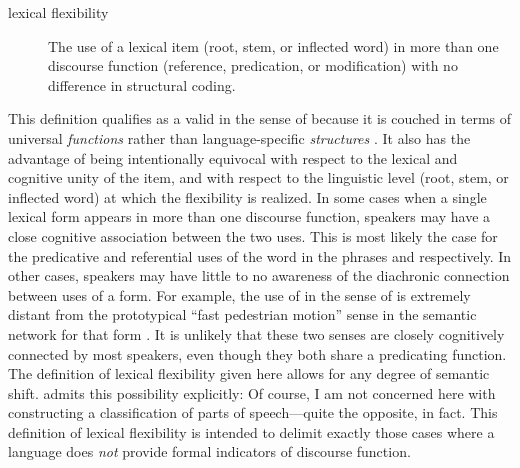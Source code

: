 \begin{description}
  \item[lexical flexibility] The use of a lexical item (root, stem, or inflected word) in more than one discourse function (reference, predication, or modification) with no difference in structural coding.
\end{description}

This definition qualifies as a valid  in the sense of \textcite{Haspelmath2010a} because it is couched in terms of universal \emph{functions} rather than language-specific \emph{structures} \parencite{Croft2016}. It also has the advantage of being intentionally equivocal with respect to the lexical and cognitive unity of the item, and with respect to the linguistic level (root, stem, or inflected word) at which the flexibility is realized. In some cases when a single lexical form appears in more than one discourse function, speakers may have a close cognitive association between the two uses. This is most likely the case for the predicative and referential uses of the word  in the phrases  and  respectively. In other cases, speakers may have little to no awareness of the diachronic connection between uses of a form. For example, the use of  in the sense of  is extremely distant from the prototypical \enquote{fast pedestrian motion} sense in the semantic network for that form . It is unlikely that these two senses are closely cognitively connected by most speakers, even though they both share a predicating function. The definition of lexical flexibility given here allows for any degree of semantic shift. \citeauthor{Croft2001b} admits this possibility explicitly:  Of course, I am not concerned here with constructing a classification of parts of speech—quite the opposite, in fact. This definition of lexical flexibility is intended to delimit exactly those cases where a language does \emph{not} provide formal indicators of discourse function.


